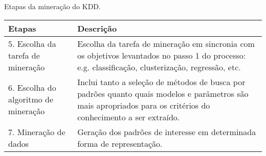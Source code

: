 \begin{quadro}[!htb]
    \centering
    \caption{Etapas da mineração do KDD.\label{qua:etapasMineKDD}}
    \begin{tabular}{|p{7cm}|p{7cm}|}
        \hline
        \textbf{Etapas} & \textbf{Descrição} \\
        \hline
        5. Escolha da tarefa de mineração & Escolha da tarefa de mineração em sincronia com os objetivos levantados no passo 1 do processo: e.g. classificação, clusterização, regressão, etc. \\ \hline
        6. Escolha do algoritmo de mineração & Inclui tanto a seleção de métodos de busca por padrões quanto quais modelos e parâmetros são mais apropriados para os critérios do conhecimento a ser extraído. \\ \hline
        7. Mineração de dados & Geração dos padrões de interesse em determinada forma de representação. \\
        \hline
    \end{tabular}
\end{quadro}